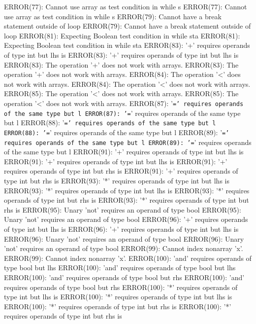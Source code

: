 \documentclass[12pt]{book}
\begin{document}
ERROR(77): Cannot use array as test condition in while s        ERROR(77): Cannot use array as test condition in while s
ERROR(79): Cannot have a break statement outside of loop        ERROR(79): Cannot have a break statement outside of loop
ERROR(81): Expecting Boolean test condition in while sta        ERROR(81): Expecting Boolean test condition in while sta
ERROR(83): '+' requires operands of type int but lhs is         ERROR(83): '+' requires operands of type int but lhs is 
ERROR(83): The operation '+' does not work with arrays.                ERROR(83): The operation '+' does not work with arrays.
ERROR(84): The operation '<' does not work with arrays.                ERROR(84): The operation '<' does not work with arrays.
ERROR(85): The operation '<' does not work with arrays.                ERROR(85): The operation '<' does not work with arrays.
ERROR(87): '\texttt{=' requires operands of the same type but l	ERROR(87): '=}' requires operands of the same type but l
ERROR(88): '\texttt{=' requires operands of the same type but l	ERROR(88): '=}' requires operands of the same type but l
ERROR(89): '\texttt{=' requires operands of the same type but l	ERROR(89): '=}' requires operands of the same type but l
ERROR(91): '+' requires operands of type int but lhs is         ERROR(91): '+' requires operands of type int but lhs is 
ERROR(91): '+' requires operands of type int but rhs is         ERROR(91): '+' requires operands of type int but rhs is 
ERROR(93): '*' requires operands of type int but lhs is         ERROR(93): '*' requires operands of type int but lhs is 
ERROR(93): '*' requires operands of type int but rhs is         ERROR(93): '*' requires operands of type int but rhs is 
ERROR(95): Unary 'not' requires an operand of type bool         ERROR(95): Unary 'not' requires an operand of type bool 
ERROR(96): '+' requires operands of type int but lhs is         ERROR(96): '+' requires operands of type int but lhs is 
ERROR(96): Unary 'not' requires an operand of type bool         ERROR(96): Unary 'not' requires an operand of type bool 
ERROR(99): Cannot index nonarray 'x'.                                ERROR(99): Cannot index nonarray 'x'.
ERROR(100): 'and' requires operands of type bool but lhs        ERROR(100): 'and' requires operands of type bool but lhs
ERROR(100): 'and' requires operands of type bool but rhs        ERROR(100): 'and' requires operands of type bool but rhs
ERROR(100): '*' requires operands of type int but lhs is        ERROR(100): '*' requires operands of type int but lhs is
ERROR(100): '*' requires operands of type int but rhs is        ERROR(100): '*' requires operands of type int but rhs is
\end{document}

